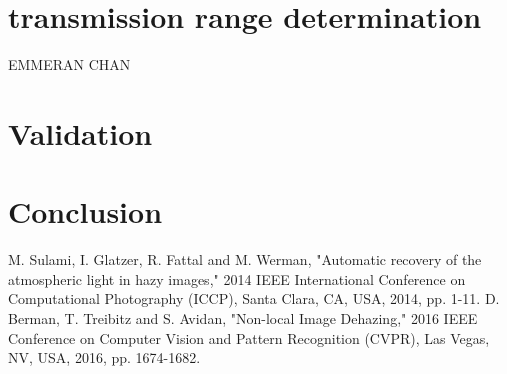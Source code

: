 \documentclass[conference]{IEEEtran}
\begin{document}
\section{transmission range determination}
EMMERAN CHAN

\section{Validation}

\section{Conclusion}


\begin{thebibliography}{00}
 M. Sulami, I. Glatzer, R. Fattal and M. Werman, "Automatic recovery of the atmospheric light in hazy images," 2014 IEEE International Conference on Computational Photography (ICCP), Santa Clara, CA, USA, 2014, pp. 1-11.
 D. Berman, T. Treibitz and S. Avidan, "Non-local Image Dehazing," 2016 IEEE Conference on Computer Vision and Pattern Recognition (CVPR), Las Vegas, NV, USA, 2016, pp. 1674-1682.
\end{thebibliography}

\vspace{12pt}
\end{document}

